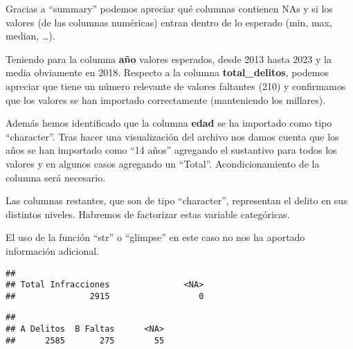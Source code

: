 \documentclass[,,,,pdftex]{Definitions/mdpi}
\newenvironment{Shaded}{\begin{snugshade}}{\end{snugshade}}
\newcommand{\AttributeTok}[1]{\textcolor[rgb]{0.13,0.29,0.53}{#1}}
\newcommand{\CommentTok}[1]{\textcolor[rgb]{0.56,0.35,0.01}{\textit{#1}}}
\newcommand{\FunctionTok}[1]{\textcolor[rgb]{0.13,0.29,0.53}{\textbf{#1}}}
\newcommand{\NormalTok}[1]{#1}
\newcommand{\SpecialCharTok}[1]{\textcolor[rgb]{0.81,0.36,0.00}{\textbf{#1}}}
\newcommand{\StringTok}[1]{\textcolor[rgb]{0.31,0.60,0.02}{#1}}
\begin{document}
Gracias a ``summary'' podemos apreciar qué columnas contienen NAs y si
los valores (de las columnas numéricas) entran dentro de lo esperado
(min, max, median, \ldots).

Teniendo para la columna \textbf{año} valores esperados, desde 2013
hasta 2023 y la media obviamente en 2018. Respecto a la columna
\textbf{total\_delitos}, podemos apreciar que tiene un número relevante
de valores faltantes (210) y confirmamos que los valores se han
importado correctamente (manteniendo los millares).

Además hemos identificado que la columna \textbf{edad} se ha importado
como tipo ``character''. Tras hacer una visualización del archivo nos
damos cuenta que los años se han importado como ``14 años'' agregando el
sustantivo para todos los valores y en algunos casos agregando un
``Total''. Acondicionamiento de la columna será necesario.

Las columnas restantes, que son de tipo ``character'', representan el
delito en sus distintos niveles. Habremos de factorizar estas variable
categóricas.

El uso de la función ``str'' o ``glimpse'' en este caso no nos ha
aportado información adicional.

\begin{Shaded}
\end{Shaded}

\begin{verbatim}
## 
## Total Infracciones               <NA> 
##               2915                  0
\end{verbatim}

\begin{Shaded}
\end{Shaded}

\begin{verbatim}
## 
## A Delitos  B Faltas      <NA> 
##      2585       275        55
\end{verbatim}
\end{document}

